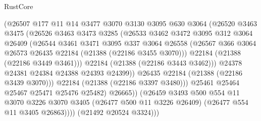 \begin{lexlean}{RustCore}
\begin{coremodule}
                        (@26507
                          @177
                          @11
                          @14
                          @3477
                          @3070
                          @3130
                          @3095
                          @630
                          @3064
                          (@26520
                            @3463
                            @3475
                            (@26526
                              @3463
                              @3473
                              @3285
                              (@26533
                                @3462
                                @3472
                                @3095
                                @312
                                @3064
                                @26409
                                (@26544
                                  @3461
                                  @3471
                                  @3095
                                  @337
                                  @3064
                                  @26558
                                  (@26567
                                    @366
                                    @3064
                                    @26573
                                    @26435
                                    @22184
                                    (@21388 (@22186 @3455 @3070)))
                                  @22184
                                  (@21388 (@22186 @3449 @3461)))
                                @22184
                                (@21388 (@22186 @3443 @3462)))
                              @24378
                              @24381
                              @24384
                              @24388
                              @24393
                              @24399))
                          @26435
                          @22184
                          (@21388 (@22186 @3439 @3070)))
                        @22184
                        (@21388 (@22186 @3397 @3480)))
                      @25461
                      @25464
                      @25467
                      @25471
                      @25476
                      @25482)
                    @26665))
                (@26459
                  @3493
                  @500
                  @554
                  @11
                  @3070
                  @3226
                  @3070
                  @3405
                  (@26477 @500 @11 @3226 @26409)
                  (@26477 @554 @11 @3405 @26863))))
            (@21492 @20524 @3324)))

\end{coremodule}
\end{lexlean}
